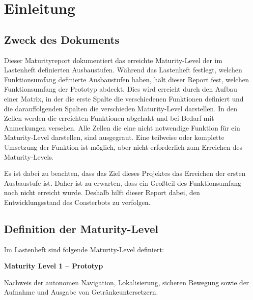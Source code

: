 \documentclass[
  a4paper,
  12pt,
  DIV=12,        %
  parskip=half,  %
  headings=small %
]{scrartcl}
\theoremstyle{definition}
\theoremstyle{definition}
\begin{document}
\newpage

\tableofcontents

\newpage

\setlength{\emergencystretch}{3em}

\section{Einleitung}\label{einleitung}

\subsection{Zweck des Dokuments}\label{zweck-des-dokuments}

Dieser Maturityreport dokumentiert das erreichte Maturity-Level der im
Lastenheft definierten Ausbaustufen. Während das Lastenheft festlegt,
welchen Funktionsumfang definierte Ausbaustufen haben, hält dieser Report fest, welchen Funktionsumfang der Prototyp abdeckt.
Dies wird erreicht durch den Aufbau einer Matrix, in der die erste Spalte die verschiedenen Funktionen definiert und
die darauffolgenden Spalten die verschieden Maturity-Level darstellen. In den Zellen werden die erreichten Funktionen abgehakt und bei Bedarf mit Anmerkungen versehen.
Alle Zellen die eine nicht notwendige Funktion für ein Maturity-Level darstellen, sind ausgegraut. Eine teilweise oder komplette Umsetzung der Funktion ist möglich, aber nicht
erforderlich zum Erreichen des Maturity-Levels.

Es ist dabei zu beachten, dass das Ziel dieses Projektes das Erreichen der ersten Ausbaustufe ist.
Daher ist zu erwarten, dass ein Großteil des Funktionsumfang noch nicht erreicht wurde. Deshalb hilft dieser Report dabei,
den Entwicklungsstand des Coasterbots zu verfolgen.

\subsection{Definition der Maturity-Level}\label{definition-der-maturity-level}
Im Lastenheft sind folgende Maturity-Level definiert:

\textbf{Maturity Level 1 -- Prototyp}

Nachweis der autonomen Navigation, Lokalisierung, sicheren Bewegung
sowie der Aufnahme und Ausgabe von Getränkeuntersetzern.
\end{document}

